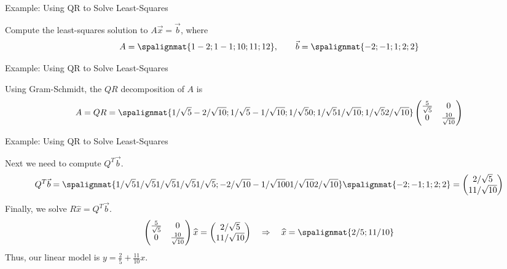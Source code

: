 \begin{frame}{Example: Using QR to Solve Least-Squares}

    Compute the least-squares solution to $ A \vec x= \vec b$, where 
    \begin{equation*}
    A = 
    \spalignmat{1 -2; 1 -1; 1 0 ; 1 1; 1 2 }
    , \qquad 
    \vec b = 
    \spalignmat{-2;-1;1;2;2}
    \end{equation*}
\end{frame}













\begin{frame}{Example: Using QR to Solve Least-Squares}

    
    Using Gram-Schmidt, the $ QR$ decomposition of $ A$ is 
    \begin{equation*}
    A= QR = \spalignmat{1/\sqrt{5} -2/\sqrt{10}; 1/\sqrt{5} -1/\sqrt{10}; 1/\sqrt{5} 0 ; 1/\sqrt{5} 1/\sqrt{10}; 1/\sqrt{5} 2/\sqrt{10} }
    \begin{pmatrix}
    \frac{5}{\sqrt 5} & 0  \\ 0 & \frac{10}{\sqrt{10}}  
    \end{pmatrix}
    \end{equation*}
    
    \vspace{1in} 
\end{frame}


\begin{frame}{Example: Using QR to Solve Least-Squares}

    
    Next we need to compute $Q^T \vec b$. 
    \pause 
    \begin{align*}
    Q ^{T} \vec b = 
    \spalignmat{1/\sqrt{5} 1/\sqrt{5} 1/\sqrt{5} 1/\sqrt{5} 1/\sqrt{5} ; -2/\sqrt{10} -1/\sqrt{10} 0  1/\sqrt{10} 2/\sqrt{10} }
    \spalignmat{-2;-1;1;2;2} 
    = \begin{pmatrix}
      2/\sqrt5 \\ 11/\sqrt{10}
    \end{pmatrix}
    \end{align*}
    \pause
    Finally, we solve $R \widehat x = Q^T \vec b$. \pause 
    \begin{align*}
        \begin{pmatrix}
        \frac{5}{\sqrt 5} & 0  \\ 0 & \frac{10}{\sqrt{10}}  
        \end{pmatrix} \widehat x = \begin{pmatrix}
          2/\sqrt5 \\ 11/\sqrt{10}
        \end{pmatrix}
        \quad \Rightarrow \quad 
        \widehat x = \spalignmat{2/5 ; 11/10}
    \end{align*}
    \pause
    Thus, our linear model is $y = \frac{2}{5} + \frac{11}{10}x$. 
\end{frame}




